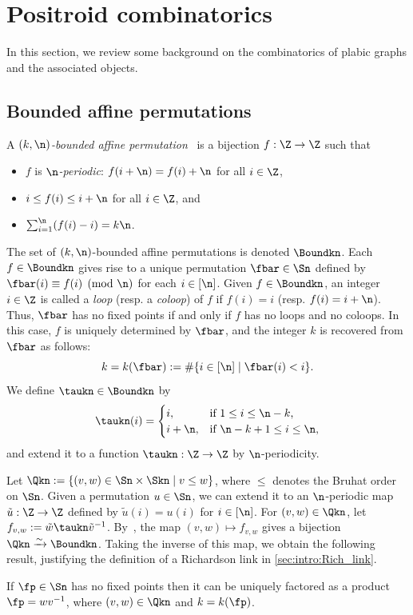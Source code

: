 \section{Positroid combinatorics}\label{sec:positr-comb}
In this section, we review some background on the combinatorics of plabic graphs and the associated objects.


\subsection{Bounded affine permutations}\label{sec:bound-affine-perm}
A \emph{$(k,\n)$-bounded affine permutation}~\cite{KLS} is a bijection $f:\Z\to\Z$ such that 
\begin{itemize}
\item $f$ is \emph{$\n$-periodic}: $f(i+\n)=f(i)+\n$ for all $i\in \Z$,
\item  $i\leq f(i)\leq i+\n$ for all $i\in\Z$, and %
\item $\sum_{i=1}^\n(f(i)-i)=k\n$.
\end{itemize}
The set of $(k,\n)$-bounded affine permutations is denoted $\Boundkn$. Each $f\in\Boundkn$ gives rise to a unique permutation $\fbar\in\Sn$ defined by $\fbar(i)\equiv f(i)\pmod \n$ for each $i\in[\n]$. Given $f\in\Boundkn$, an integer $i\in\Z$ is called a \emph{loop} (resp. a \emph{coloop}) of $f$ if $f(i)=i$ (resp. $f(i)=i+\n$). Thus, $\fbar$ has no fixed points if and only if $f$ has no loops and no coloops. In this case, $f$ is uniquely determined by $\fbar$, and the integer $k$ is recovered from $\fbar$ as follows:
\begin{equation*}%
  k=k(\fbar):=\#\{i\in[\n]\mid \fbar(i)<i\}.
\end{equation*}
We define $\taukn\in\Boundkn$  by
\begin{equation*}%
  \taukn(i)=
  \begin{cases}
    i, &\text{if $1\leq i\leq \n-k$,}\\
    i+\n, &\text{if $\n-k+1\leq i\leq \n$,}
  \end{cases}
\end{equation*}
and extend it to a function $\taukn:\Z\to\Z$ by $\n$-periodicity. 


Let $\Qkn:=\{(v,w)\in \Sn\times \Skn\mid v\leq w\}$, where $\leq$ denotes the Bruhat order on $\Sn$. Given a permutation $u\in\Sn$, we can extend it to an $\n$-periodic map $\tilde u:\Z\to\Z$ defined by $\tilde u(i)=u(i)$ for $i\in[\n]$. For $(v,w)\in\Qkn$, let $f_{v,w}:=\tilde w\taukn\tilde v^{-1}$. By~\cite[Proposition~3.15]{KLS}, the map $(v,w)\mapsto f_{v,w}$ gives a bijection $\Qkn\xrightarrow{\sim} \Boundkn$. Taking the inverse of this map, we obtain the following result, justifying the definition of a Richardson link in \cref{sec:intro:Rich_link}.
\begin{corollary}\label{cor:KLS}
If $\fp\in\Sn$ has no fixed points then it can be uniquely factored as a product $\fp=wv^{-1}$, where $(v,w)\in\Qkn$ and $k=k(\fp)$.
\end{corollary}

